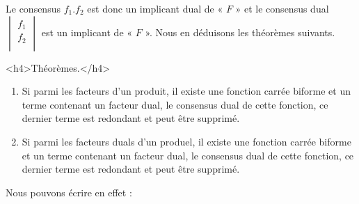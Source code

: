 Le consensus $f_1 . f_2$ est donc un implicant dual de « $F$ » et le consensus dual $\begin{vmatrix} f_1 \\ f_2 \\ \end{vmatrix} $ est un implicant de   « $F$ ». Nous en déduisons les théorèmes suivants. 

<h4>Théorèmes.</h4> \begin{enumerate}
\item Si parmi les facteurs d'un produit, il existe une fonction carrée biforme et un terme contenant un facteur dual, le consensus dual de cette fonction, ce dernier terme est redondant et peut être supprimé. 

\item Si parmi les facteurs  duals d'un produel, il existe une fonction carrée biforme et un terme contenant un facteur dual, le consensus dual de cette fonction, ce dernier terme est redondant et peut être supprimé. 

\end{enumerate} 

Nous pouvons écrire en effet : 




